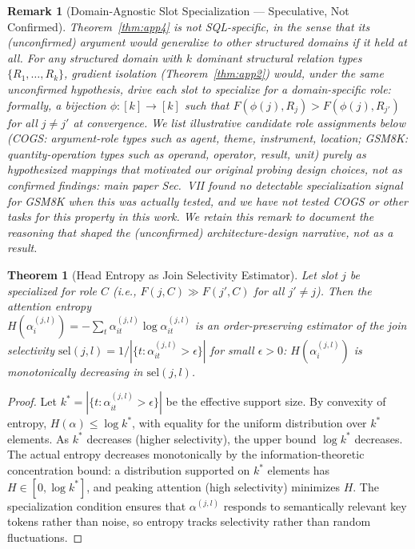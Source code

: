 \documentclass[conference]{IEEEtran}
\newtheorem{theorem}{Theorem}
\newtheorem{remark}{Remark}
\begin{document}
\begin{remark}[Domain-Agnostic Slot Specialization --- Speculative, Not Confirmed]
\label{rem:domain_agnostic}
Theorem~\ref{thm:app4} is not SQL-specific, \emph{in the sense that its (unconfirmed) argument would generalize to other structured domains if it held at all}. For any structured domain with $k$ dominant structural relation types $\{R_1,\ldots,R_k\}$, gradient isolation (Theorem~\ref{thm:app2}) would, under the same unconfirmed hypothesis, drive each slot to specialize for a domain-specific role: formally, a bijection $\phi:[k]\to[k]$ such that $F(\phi(j), R_j) > F(\phi(j), R_{j'})$ for all $j \neq j'$ at convergence. We list illustrative candidate role assignments below (COGS: argument-role types such as agent, theme, instrument, location; GSM8K: quantity-operation types such as operand, operator, result, unit) purely as \emph{hypothesized} mappings that motivated our original probing design choices, not as confirmed findings: main paper Sec.~VII found no detectable specialization signal for GSM8K when this was actually tested, and we have not tested COGS or other tasks for this property in this work. We retain this remark to document the reasoning that shaped the (unconfirmed) architecture-design narrative, not as a result.
\end{remark}

\begin{theorem}[Head Entropy as Join Selectivity Estimator]
\label{thm:app5}
Let slot $j$ be specialized for role $C$ (i.e., $F(j,C) \gg F(j',C)$ for all $j' \neq j$). Then the attention entropy \\
$H(\alpha_i^{(j,l)}) = -\sum_t \alpha_{it}^{(j,l)}\log\alpha_{it}^{(j,l)}$ is an order-preserving estimator of the join selectivity $\mathrm{sel}(j,l) = 1/|\{t : \alpha_{it}^{(j,l)} > \epsilon\}|$ for small $\epsilon > 0$: $H(\alpha_i^{(j,l)})$ is monotonically decreasing in $\mathrm{sel}(j,l)$.
\end{theorem}
\begin{proof}
	\renewcommand{\qedsymbol}{}
Let $k^* = |\{t:\alpha_{it}^{(j,l)} > \epsilon\}|$ be the effective support size. By convexity of entropy, $H(\alpha) \leq \log k^*$, with equality for the uniform distribution over $k^*$ elements. As $k^*$ decreases (higher selectivity), the upper bound $\log k^*$ decreases. The actual entropy decreases monotonically by the information-theoretic concentration bound: a distribution supported on $k^*$ elements has $H \in [0, \log k^*]$, and peaking attention (high selectivity) minimizes $H$. The specialization condition ensures that $\alpha^{(j,l)}$ responds to semantically relevant key tokens rather than noise, so entropy tracks selectivity rather than random fluctuations.
\end{proof}
\end{document}
